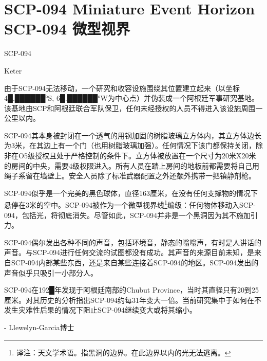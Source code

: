 \chapter[SCP-094 微型视界]{
    SCP-094 Miniature Event Horizon\\
    SCP-094 微型视界
}

\label{chap:SCP-094}

SCP-094

Keter

由于SCP-094无法移动，一个研究和收容设施围绕其位置建立起来（以坐标4█.██████°S, 6█.██████°W为中心点）并伪装成一个阿根廷军事研究基地。该基地由SCP和阿根廷联合军队保卫，任何未经授权的人员不得进入该设施周围一公里以内。

SCP-094其本身被封闭在一个透气的用钢加固的树脂玻璃立方体内，其立方体边长为3米，在其边上有一个门（也用树脂玻璃加强）。任何情况下该门都保持关闭，除非在O5级授权且处于严格控制的条件下。立方体被放置在一个尺寸为20米X20米的房间的中央，需要4级权限进入。所有人员在踏上房间的地板前都需要将自己用绳子系留在墙壁上。安全人员除了标准武器配置之外还额外携带一把镇静剂枪。

SCP-094似乎是一个完美的黑色球体，直径163厘米，在没有任何支撑物的情况下悬停在3米的空中。SCP-094被作为一个微型视界线\footnote{译注：天文学术语。指黑洞的边界。在此边界以内的光无法逃离。}编级：任何物体移动入SCP-094，包括光，将彻底消失。尽管如此，SCP-094并非是一个黑洞因为其不施加引力。

SCP-094偶尔发出各种不同的声音，包括环境音，静态的嗡嗡声，有时是人讲话的声音。与SCP-094进行任何交流的试图都没有成功。其声音的来源目前未知，是来自SCP-094内部某些东西，还是来自某些连接着SCP-094的地区。SCP-094发出的声音似乎只吸引一小部分人。

SCP-094在192█年发现于阿根廷南部的Chubut Province，当时其直径只有20到25厘米。对其历史的分析指出SCP-094约每31年变大一倍。当前研究集中于如何在不发生灾难性后果的情况下阻止SCP-094继续变大或将其缩小。

 - Llewelyn-Garcia博士
